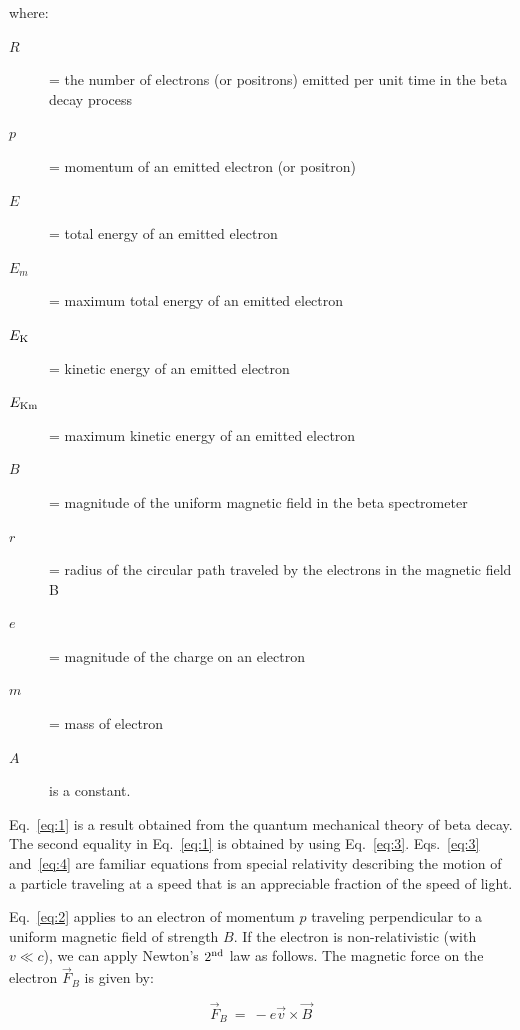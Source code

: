 \noindent where:

\begin{description}
\item[$R$] = the number of electrons (or positrons) emitted per unit time in the beta decay process

\item[$p$] = momentum of an emitted electron (or positron)

\item[$E$] = total energy of an emitted electron

\item[$E_{m}$] = maximum total energy of an emitted electron

\item[$E_{\rm K}$] = kinetic energy of an emitted electron

\item[$E_{\rm Km}$] = maximum kinetic energy of an emitted electron

\item[$B$] = magnitude of the uniform magnetic field in the beta spectrometer

\item[$r$] = radius of the circular path traveled by the electrons in the magnetic field B

\item[$e$] = magnitude of the charge on an electron

\item[$m$] = mass of electron

\item[$A$] is a constant.
\end{description}

Eq.~\ref{eq:1} is a result obtained from the quantum mechanical theory of beta
decay.  The second equality in Eq.~\ref{eq:1} is obtained by using Eq.~\ref{eq:3}.
Eqs.~\ref{eq:3} and~\ref{eq:4} are familiar equations from special relativity
describing the motion of a particle traveling at a speed that is an
appreciable fraction of the speed of light.

Eq.~\ref{eq:2} applies to an electron of momentum $p$ traveling
perpendicular to a uniform magnetic field of strength $B$.  If the
electron is non-relativistic (with $v \ll c$), we can
apply Newton's $2^{\rm nd}$
law as follows.  The magnetic force on the electron
$\vec{F}_B$ is
given by:

\begin{equation}
\vec{F}_B~=~ - e \vec{v} \times \vec{B}
\end{equation}

